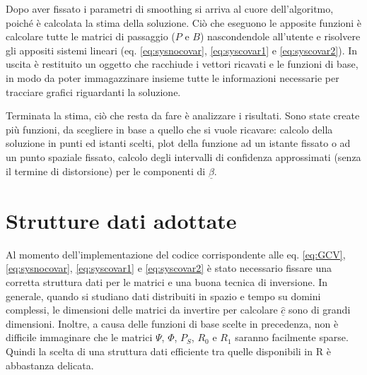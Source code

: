 \documentclass[a4paper,11pt,twoside,openright]{book}							%
\begin{document}
Dopo aver fissato i parametri di smoothing si arriva al cuore dell'algoritmo, poiché è calcolata la stima della soluzione. Ciò che eseguono le apposite funzioni è calcolare tutte le matrici di passaggio ($P$ e $B$) nascondendole all'utente e risolvere gli appositi sistemi lineari (eq. \ref{eq:sysnocovar}, \ref{eq:syscovar1} e \ref{eq:syscovar2}). In uscita è restituito un oggetto che racchiude i vettori ricavati e le funzioni di base, in modo da poter immagazzinare insieme tutte le informazioni necessarie per tracciare grafici riguardanti la soluzione.

Terminata la stima, ciò che resta da fare è analizzare i risultati. Sono state create più funzioni, da scegliere in base a quello che si vuole ricavare: calcolo della soluzione in punti ed istanti scelti, plot della funzione ad un istante fissato o ad un punto spaziale fissato, calcolo degli intervalli di confidenza approssimati (senza il termine di distorsione) per le componenti di $\underline{\beta}$.

\section{Strutture dati adottate}
Al momento dell'implementazione del codice corrispondente alle eq. \ref{eq:GCV}, \ref{eq:sysnocovar}, \ref{eq:syscovar1} e \ref{eq:syscovar2} è stato necessario fissare una corretta struttura dati per le matrici e una buona tecnica di inversione. In generale, quando si studiano dati distribuiti in spazio e tempo su domini complessi, le dimensioni delle matrici da invertire per calcolare $\hat{\underline{c}}$ sono di grandi dimensioni. Inoltre, a causa delle funzioni di base scelte in precedenza, non è difficile immaginare che le matrici $\Psi$, $\Phi$, $P_S$, $R_0$ e $R_1$ saranno facilmente sparse. Quindi la scelta di una struttura dati efficiente tra quelle disponibili in R è abbastanza delicata.
\end{document}

